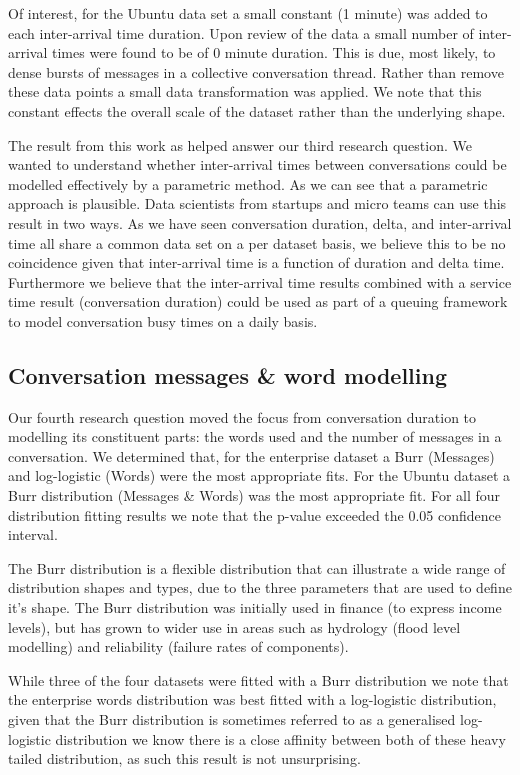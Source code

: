 \documentclass[conference]{IEEEtran}
\begin{document}
Of interest, for the Ubuntu data set a small constant (1 minute) was added to each inter-arrival time duration. Upon review of the data a small number of inter-arrival times were found to be of 0 minute duration. This is due, most likely, to dense bursts of messages in a collective conversation thread. Rather than remove these data points a small data transformation was applied. We note that this constant effects the overall scale of the dataset rather than the underlying shape.

The result from this work as helped answer our third research question. We wanted to understand whether inter-arrival times between conversations could be modelled effectively by a parametric method. As we can see that a parametric approach is plausible. Data scientists from startups and micro teams can use this result in two ways. As we have seen conversation duration, delta, and inter-arrival time all share a common data set on a per dataset basis, we believe this to be no coincidence given that inter-arrival time is a function of duration and delta time. Furthermore we believe that the inter-arrival time results combined with a service time result (conversation duration) could be used as part of a queuing framework to model conversation busy times on a daily basis.

\subsection{Conversation messages \& word modelling}

Our fourth research question moved the focus from conversation duration to modelling its constituent parts: the words used and the number of messages in a conversation. We determined that, for the enterprise dataset a Burr (Messages) and log-logistic (Words) were the most appropriate fits. For the Ubuntu dataset a Burr distribution (Messages \& Words) was the most appropriate fit. For all four distribution fitting results we note that the p-value exceeded the 0.05 confidence interval.  

The Burr distribution is a flexible distribution that can illustrate a wide range of distribution shapes and types, due to the three parameters that are used to define it's shape. The Burr distribution was initially used in finance (to express income levels), but has grown to wider use in areas such as hydrology (flood level modelling) and reliability (failure rates of components). 

While three of the four datasets were fitted with a Burr distribution we note that the enterprise words distribution was best fitted with a log-logistic distribution, given that the Burr distribution is sometimes referred to as a generalised log-logistic distribution we know there is a close affinity between both of these heavy tailed distribution, as such this result is not unsurprising.
\end{document}
